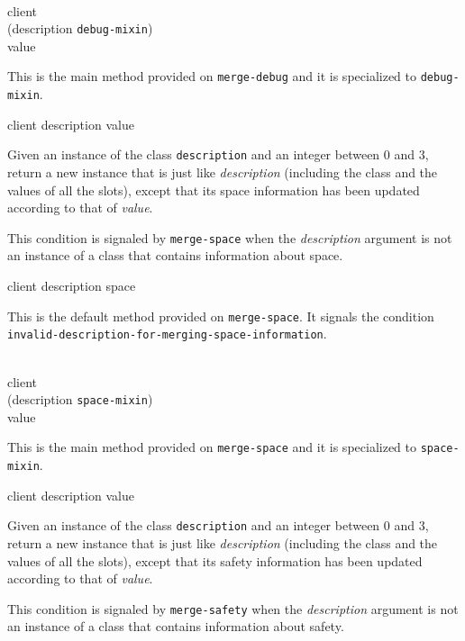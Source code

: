 {\footnotesize
{}\\
           {client\\
            (description {\tt debug-mixin})\\
            value}
}

This is the main method provided on \texttt{merge-debug} and it is
specialized to \texttt{debug-mixin}.

{\footnotesize
{} {client description value}
}

Given an instance of the class \texttt{description} and an
integer between $0$ and $3$, return a new instance that is just like
\textit{description} (including the class and the values of
all the slots), except that its space information has been updated
according to that of \textit{value}.

{\footnotesize
{}
}

This condition is signaled by \texttt{merge-space} when the
\textit{description} argument is not an instance of a class that
contains information about space.

{\footnotesize
{} {client description space}
}

This is the default method provided on \texttt{merge-space}.  It
signals the condition
\texttt{invalid-description-for-merging-space-information}.

{\footnotesize
{}\\
           {client\\
            (description {\tt space-mixin})\\
            value}
}

This is the main method provided on \texttt{merge-space} and it is
specialized to \texttt{space-mixin}.

{\footnotesize
{} {client description value}
}

Given an instance of the class \texttt{description} and an
integer between $0$ and $3$, return a new instance that is just like
\textit{description} (including the class and the values of
all the slots), except that its safety information has been updated
according to that of \textit{value}.

{\footnotesize
{}
}

This condition is signaled by \texttt{merge-safety} when the
\textit{description} argument is not an instance of a class that
contains information about safety.

